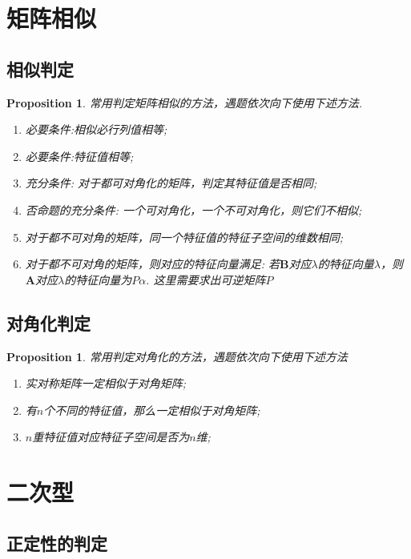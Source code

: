 \documentclass{article}
\newtheorem{proposition}[theorem]{Proposition}
\newcommand{\mbf}[1]{\bm{#1}}
\begin{document}
\newpage
\section{矩阵相似}

\subsection{相似判定}

\begin{proposition}
\rm 常用判定矩阵相似的方法，遇题依次向下使用下述方法.
\begin{enumerate}
	\item 必要条件:相似必行列值相等;
	\item 必要条件:特征值相等;
	\item 充分条件: 对于都可对角化的矩阵，判定其特征值是否相同;
	\item 否命题的充分条件: 一个可对角化，一个不可对角化，则它们不相似;
	\item 对于都不可对角的矩阵，同一个特征值的特征子空间的维数相同;	
	\item 对于都不可对角的矩阵，则对应的特征向量满足: 若$\mbf{B}$对应$\lambda$的特征向量$\lambda$，则$\mbf{A}$对应$\lambda$的特征向量为$P\alpha$. 这里需要求出可逆矩阵$P$
\end{enumerate}
\end{proposition}


\subsection{对角化判定}

\begin{proposition}
\rm 常用判定对角化的方法，遇题依次向下使用下述方法
\begin{enumerate}
	\item 实对称矩阵一定相似于对角矩阵;	
	\item 有$n$个不同的特征值，那么一定相似于对角矩阵;
	\item $n$重特征值对应特征子空间是否为$n$维;
\end{enumerate}
\end{proposition}

\section{二次型}

\subsection{正定性的判定}
\end{document}
